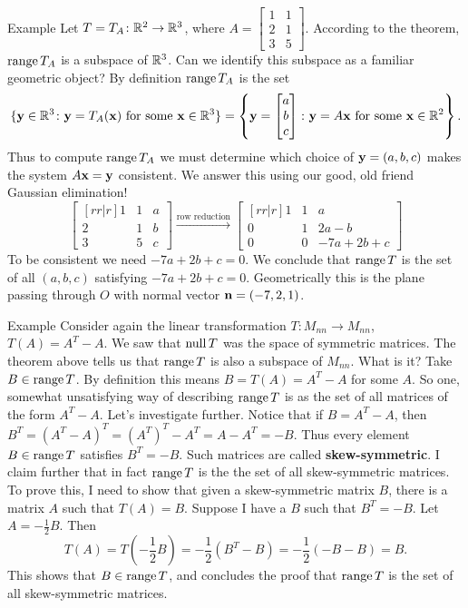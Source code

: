 \begin{frame}{Example}
Let $T=T_A\colon {\mathbb R}^2\rightarrow{\mathbb R}^3$, where $A=\begin{bmatrix}
1&1\\
2&1\\
3&5
\end{bmatrix}$. According to the theorem, $\operatorname{range} T_A$ is a subspace of ${\mathbb R}^3$. Can we identify this subspace as a familiar geometric object?
\bpause
By definition $\operatorname{range} T_A$ is the set 
\[
\{{\mathbf y}\in{\mathbb R}^3\colon {\mathbf y}=T_A({\mathbf x}) \text{ for some ${\mathbf x}\in {\mathbb R}^3$}\}=\left\{{\mathbf y}=\begin{bmatrix}
a\\ b\\ c
\end{bmatrix}\colon {\mathbf y}=A{\mathbf x} \text{ for some ${\mathbf x}\in{\mathbb R}^2$}\right\}.\]
\pause 
Thus to compute $\operatorname{range} T_A$ we must determine which choice of ${\mathbf y}=(a,b,c)$ makes the system $A{\mathbf x}={\mathbf y}$ consistent.
We answer this using our good, old friend Gaussian elimination! 
\pause
\[
\begin{bmatrix}[rr|r]
1&1&a\\
2&1&b\\
3&5&c
\end{bmatrix}
\xrightarrow{\text{row reduction}}\begin{bmatrix}[rr|r]
1&1&a\\
0&1&2a-b\\
0&0&-7a+2b+c
\end{bmatrix} \]
\pause
To be consistent we need $-7a+2b+c=0$. We conclude that $\operatorname{range} T$ is the set of all $(a,b,c)$ satisfying $-7a+2b+c=0$. Geometrically this is the plane passing through $O$ with normal vector ${\mathbf n}=(-7,2,1)$. 
\end{frame}
\begin{frame}{Example}
Consider again the linear transformation $T\colon M_{nn}\rightarrow M_{nn}$, $T(A)=A^T-A$. We saw that $\operatorname{null} T$ was the space of symmetric matrices. The theorem above tells us that $\operatorname{range} T$ is also a subspace of $M_{nn}$. What is it?
\bpause
Take $B\in \operatorname{range} T$. By definition this means $B=T(A)=A^T-A$ for some $A$. So one, somewhat unsatisfying way of describing $\operatorname{range} T$ is as the set of all matrices of the form $A^T-A$. 
\bpause
Let's investigate further. Notice that if $B=A^T-A$, then $B^T=(A^T-A)^T=(A^T)^T-A^T=A-A^T=-B$. Thus every element $B\in \operatorname{range} T$ satisfies $B^T=-B$. Such matrices are called {\bf skew-symmetric}. 
\bpause I claim further that in fact $\operatorname{range} T$ is the the set of \alert{all} skew-symmetric matrices. To prove this, I need to show that given a skew-symmetric matrix $B$, there is a matrix $A$ such that $T(A)=B$. 
\bpause Suppose I have a $B$ such that $B^T=-B$. Let $A=-\frac{1}{2}B$. Then
\[
T(A)=T(-\frac{1}{2}B)=-\frac{1}{2}(B^T-B)=-\frac{1}{2}(-B-B)=B.
\] 
This shows that $B\in \operatorname{range} T$, and concludes the proof that $\operatorname{range} T$ is the set of all skew-symmetric matrices. 
 
\end{frame}
